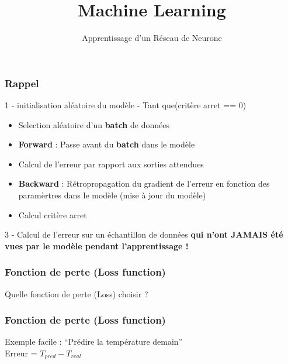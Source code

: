 \documentclass{formation}
\title{Machine Learning}
\subtitle{Apprentissage d'un Réseau de Neurone}
\begin{document}
\maketitle

\begin{frame}
  \frametitle{Rappel}
  1 - initialisation aléatoire du modèle
   - Tant que(critère arret == 0)
  \begin{itemize}
  \item Selection aléatoire d'un \textbf{batch} de données
  \item \textbf{Forward} : Passe avant du \textbf{batch} dans le modèle
  \item Calcul de l'erreur par rapport aux sorties attendues
  \item \textbf{Backward} : Rétropropagation du gradient de l'erreur en fonction des paramèrtres dans le modèle (mise à jour du modèle)
  \item Calcul critère arret
  \end{itemize}
  3 - Calcul de l'erreur sur un échantillon de données  \textbf{qui n'ont JAMAIS été vues par le modèle pendant l'apprentissage !}
\end{frame}

\begin{frame}
  \frametitle{Fonction de perte (\textbf{Loss} function)}
  \begin{center}
    \huge{Quelle fonction de perte (Loss) choisir ?}
  \end{center}
\end{frame}

\begin{frame}
  \frametitle{Fonction de perte (\textbf{Loss} function)}
  Exemple facile : ``Prédire la température demain'' \\
  \newline
  \newline
  Erreur = $T_{pred} - T_{real}$
\end{frame}
\end{document}
